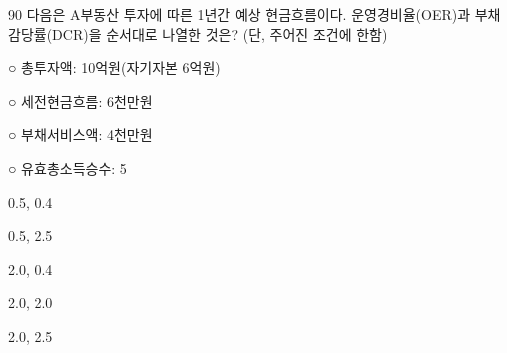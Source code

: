 \begin{question}{90}
다음은 A부동산 투자에 따른 1년간 예상 현금흐름이다. 운영경비율(OER)과 부채감당률(DCR)을 순서대로 나열한 것은? (단, 주어진 조건에 한함)
\begin{framedtext}
○ 총투자액: 10억원(자기자본 6억원) \par
○ 세전현금흐름: 6천만원 \par
○ 부채서비스액: 4천만원 \par
○ 유효총소득승수: 5
\end{framedtext}
\begin{choices}
  \item 0.5, 0.4
  \item 0.5, 2.5
  \item 2.0, 0.4
  \item 2.0, 2.0
  \item 2.0, 2.5
\end{choices}
\end{question}
